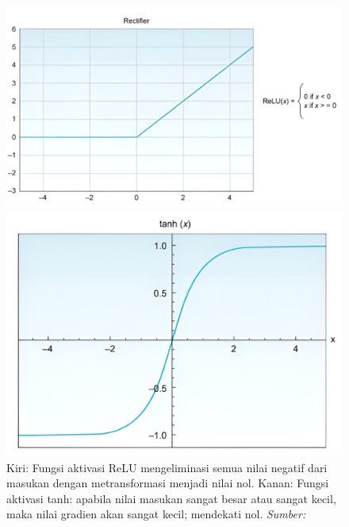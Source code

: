 \begin{figure}[ht]
  \centering
  \begin{minipage}{0.45\textwidth}
    \centering
    \includegraphics[width=1\linewidth]{gambar/relu1.png} %
  \end{minipage}\hfill
  \begin{minipage}{0.45\textwidth}
    \centering
    \includegraphics[width=1\linewidth]{gambar/tanh.png} %
  \end{minipage}
  \caption{Kiri: Fungsi aktivasi ReLU mengeliminasi semua nilai negatif dari masukan dengan metransformasi menjadi nilai nol. Kanan: Fungsi aktivasi tanh: apabila nilai masukan sangat besar atau sangat kecil, maka nilai gradien akan sangat kecil; mendekati nol. \emph{Sumber: \citep{elgendy_2020}}}
  \label{fungsi_aktivasi}
\end{figure}

